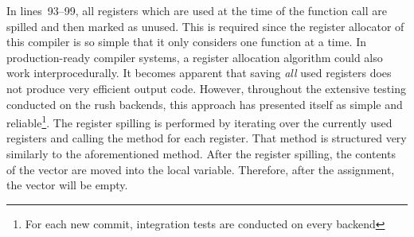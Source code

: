
In lines~93--99, all registers which are used at the time of the function call are spilled and then marked as unused.
This is required since the register allocator of this compiler is so simple that it only considers one function at a time.
In production-ready compiler systems, a register allocation algorithm could also work interprocedurally.
It becomes apparent that saving \emph{all} used registers does not produce very efficient output code.
However, throughout the extensive testing conducted on the rush backends, this approach has presented itself as simple and reliable\footnote{For each new commit, \rushCountTests integration tests are conducted on every backend}.
The register spilling is performed by iterating over the currently used registers and calling the  method for each register.
That method is structured very similarly to the aforementioned  method.
After the register spilling, the contents of the  vector are moved into the local  variable.
Therefore, after the assignment, the  vector will be empty.


